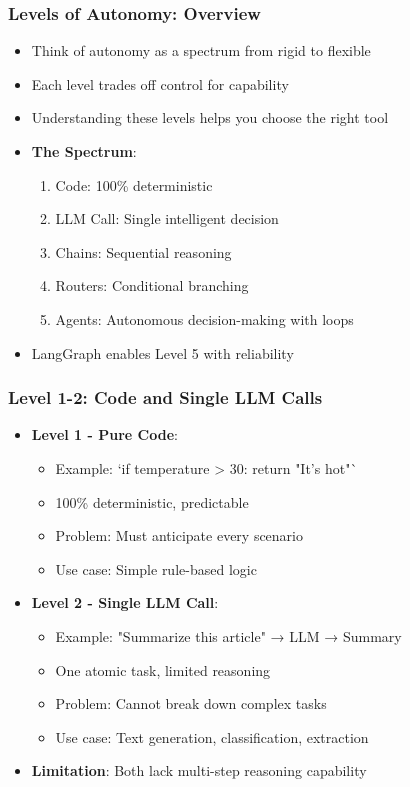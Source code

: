 \begin{frame}[fragile]\frametitle{Levels of Autonomy: Overview}
      \begin{itemize}
        \item Think of autonomy as a spectrum from rigid to flexible
        \item Each level trades off control for capability
        \item Understanding these levels helps you choose the right tool
        \item \textbf{The Spectrum}:
        \begin{enumerate}
            \item Code: 100\% deterministic
            \item LLM Call: Single intelligent decision
            \item Chains: Sequential reasoning
            \item Routers: Conditional branching
            \item Agents: Autonomous decision-making with loops
        \end{enumerate}
        \item LangGraph enables Level 5 with reliability
      \end{itemize}
\end{frame}

\begin{frame}[fragile]\frametitle{Level 1-2: Code and Single LLM Calls}
      \begin{itemize}
        \item \textbf{Level 1 - Pure Code}:
        \begin{itemize}
            \item Example: `if temperature > 30: return "It's hot"` 
            \item 100\% deterministic, predictable
            \item Problem: Must anticipate every scenario
            \item Use case: Simple rule-based logic
        \end{itemize}
        \item \textbf{Level 2 - Single LLM Call}:
        \begin{itemize}
            \item Example: "Summarize this article" → LLM → Summary
            \item One atomic task, limited reasoning
            \item Problem: Cannot break down complex tasks
            \item Use case: Text generation, classification, extraction
        \end{itemize}
        \item \textbf{Limitation}: Both lack multi-step reasoning capability
      \end{itemize}
\end{frame}

